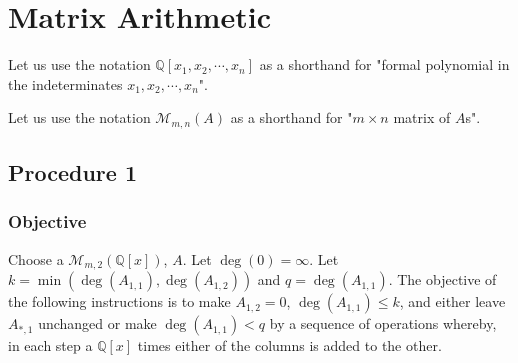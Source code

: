 \documentclass[twocolumn]{article}
\begin{document}
	\section{Matrix Arithmetic}\label{sec:body}
		Let us use the notation $\mathbb{Q}[x_1,x_2,\cdots,x_n]$ as a shorthand for "formal polynomial in the indeterminates $x_1,x_2,\cdots,x_n$".
		
		Let us use the notation $\mathcal{M}_{m,n}(A)$ as a shorthand for "$m\times n$ matrix of $A$s".
		\subsection{Procedure 1}\label{sec:procedure 1}
			\subsubsection{Objective}
				Choose a $\mathcal{M}_{m,2}(\mathbb{Q}[x])$, $A$. Let $\deg(0)=\infty$. Let $k=\min(\deg(A_{1,1}),\deg(A_{1,2}))$ and $q=\deg(A_{1,1})$. The objective of the following instructions is to make $A_{1,2}=0$, $\deg(A_{1,1})\le k$, and either leave $A_{*,1}$ unchanged or make $\deg(A_{1,1})<q$ by a sequence of operations whereby, in each step a $\mathbb{Q}[x]$ times either of the columns is added to the other.
\end{document}
